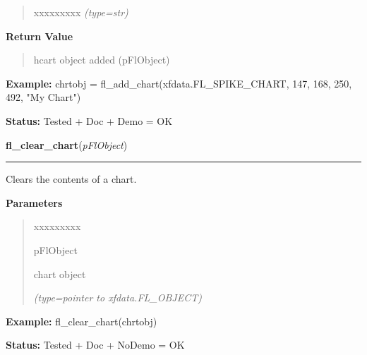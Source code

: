 \begin{boxedminipage}{\funcwidth}
\begin{quote}
\begin{Ventry}{xxxxxxxxx}
            {\it (type=str)}

        \end{Ventry}

      \end{quote}

      \textbf{Return Value}
    \vspace{-1ex}

      \begin{quote}
      hcart object added (pFlObject)

      \end{quote}

\textbf{Example:} chrtobj = fl\_add\_chart(xfdata.FL\_SPIKE\_CHART, 147, 168, 250, 492, "My 
Chart")



\textbf{Status:} Tested + Doc + Demo = OK



    \end{boxedminipage}

    \label{xformslib:flchart:fl_clear_chart}

    \vspace{0.5ex}

\hspace{.8\funcindent}\begin{boxedminipage}{\funcwidth}

    \raggedright \textbf{fl\_clear\_chart}(\textit{pFlObject})

    \vspace{-1.5ex}

    \rule{\textwidth}{0.5\fboxrule}
\setlength{\parskip}{2ex}
    Clears the contents of a chart.

\setlength{\parskip}{1ex}
      \textbf{Parameters}
      \vspace{-1ex}

      \begin{quote}
        \begin{Ventry}{xxxxxxxxx}

          \item[pFlObject]

          chart object

            {\it (type=pointer to xfdata.FL\_OBJECT)}

        \end{Ventry}

      \end{quote}

\textbf{Example:} fl\_clear\_chart(chrtobj)



\textbf{Status:} Tested + Doc + NoDemo = OK



    \end{boxedminipage}

